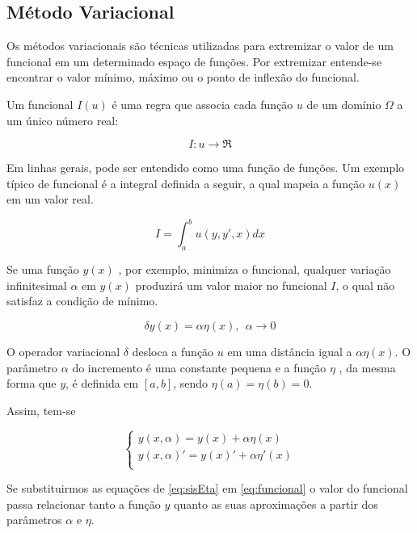 \subsection{Método Variacional}
Os métodos variacionais são técnicas utilizadas para extremizar o valor de um funcional em um determinado espaço de funções. Por extremizar entende-se encontrar o valor mínimo, máximo ou o ponto de inflexão do funcional.

Um funcional $ I(u) $ é uma regra que associa cada função $ u $ de um domínio $ \Omega $ a um único número real:

\begin{equation}
I : u \rightarrow \Re
\end{equation}

Em linhas gerais, pode ser entendido como uma função de funções. Um exemplo típico de funcional é a integral definida a seguir, a qual mapeia a função $ u(x) $ em um valor real.

\begin{equation}
\label{eq:funcional}
I = \int_{a}^{b} u(y, y', x) dx
\end{equation}

Se uma função $ y(x) $ , por exemplo, minimiza o funcional, qualquer variação infinitesimal $ \alpha $ em $ y(x) $ produzirá um valor maior no funcional $ I $, o qual não satisfaz a condição de mínimo.

\begin{equation}
\delta y(x) = \alpha \eta(x), \ \  \alpha \rightarrow 0
\end{equation}

O operador variacional $ \delta $ desloca a função $ u $ em uma distância igual a $ \alpha \eta(x) $. O parâmetro $ \alpha $ do incremento é uma constante pequena e a função $ \eta $ , da mesma forma que $ y $, é definida em $[a,b]$, sendo $\eta(a) = \eta(b) = 0$.

Assim, tem-se 

\begin{equation}
	\label{eq:sisEta}
	\begin{cases}
        y(x, \alpha) = y(x) + \alpha \eta(x) \\
        y(x, \alpha)' = y(x)' + \alpha \eta'(x) \\
    \end{cases}
\end{equation}

Se substituirmos as equações de \ref{eq:sisEta} em \ref{eq:funcional} o valor do funcional passa relacionar tanto a função $ y $ quanto as suas aproximações a partir dos parâmetros $ \alpha $ e $ \eta $.

